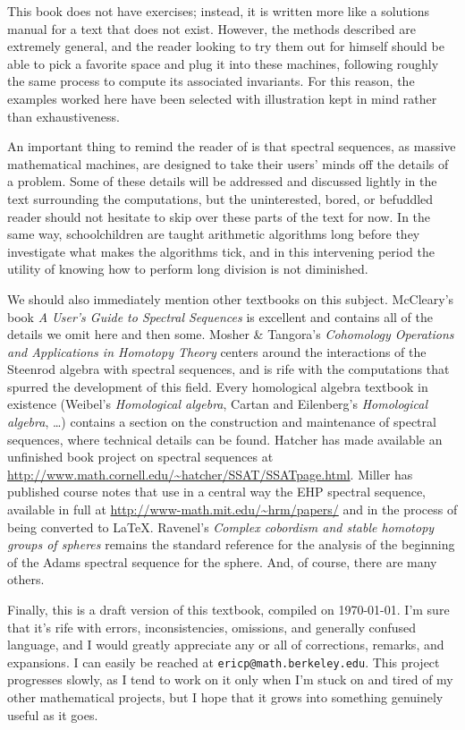 This book does not have exercises; instead, it is written more like a solutions manual for a text that does not exist.  However, the methods described are extremely general, and the reader looking to try them out for himself should be able to pick a favorite space and plug it into these machines, following roughly the same process to compute its associated invariants.  For this reason, the examples worked here have been selected with illustration kept in mind rather than exhaustiveness.

An important thing to remind the reader of is that spectral sequences, as massive mathematical machines, are designed to take their users' minds off the details of a problem.  Some of these details will be addressed and discussed lightly in the text surrounding the computations, but the uninterested, bored, or befuddled reader should not hesitate to skip over these parts of the text for now.  In the same way, schoolchildren are taught arithmetic algorithms long before they investigate what makes the algorithms tick, and in this intervening period the utility of knowing how to perform long division is not diminished.

We should also immediately mention other textbooks on this subject.  McCleary's book \textit{A User's Guide to Spectral Sequences} is excellent and contains all of the details we omit here and then some.  Mosher \& Tangora's \textit{Cohomology Operations and Applications in Homotopy Theory} centers around the interactions of the Steenrod algebra with spectral sequences, and is rife with the computations that spurred the development of this field.  Every homological algebra textbook in existence (Weibel's \textit{Homological algebra}, Cartan and Eilenberg's \textit{Homological algebra}, \ldots) contains a section on the construction and maintenance of spectral sequences, where technical details can be found.  Hatcher has made available an unfinished book project on spectral sequences at \url{http://www.math.cornell.edu/~hatcher/SSAT/SSATpage.html}.  Miller has published course notes that use in a central way the EHP spectral sequence, available in full at \url{http://www-math.mit.edu/~hrm/papers/} and in the process of being converted to \LaTeX.  Ravenel's \textit{Complex cobordism and stable homotopy groups of spheres} remains the standard reference for the analysis of the beginning of the Adams spectral sequence for the sphere.  And, of course, there are many others.

Finally, this is a draft version of this textbook, compiled on \today.  I'm sure that it's rife with errors, inconsistencies, omissions, and generally confused language, and I would greatly appreciate any or all of corrections, remarks, and expansions.  I can easily be reached at \texttt{ericp@math.berkeley.edu}.  This project progresses slowly, as I tend to work on it only when I'm stuck on and tired of my other mathematical projects, but I hope that it grows into something genuinely useful as it goes.

